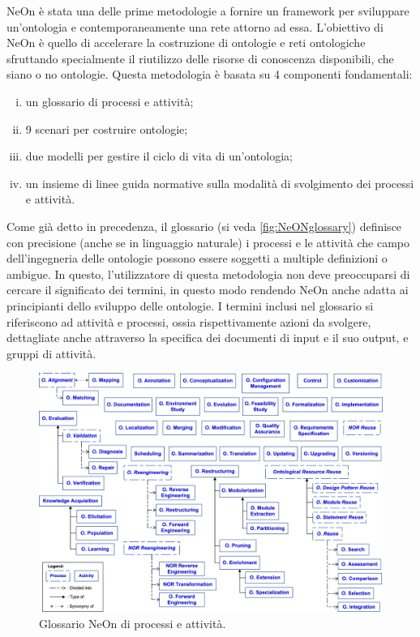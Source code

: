 NeOn \cite{NeOn} è stata una delle prime metodologie a fornire un framework per sviluppare un'ontologia e contemporaneamente una rete attorno ad essa. L'obiettivo di NeOn è quello di accelerare la costruzione di ontologie e reti ontologiche sfruttando specialmente il riutilizzo delle risorse di conoscenza disponibili, che siano o no ontologie. Questa metodologia è basata su 4 componenti fondamentali:
\begin{enumerate}[i.]
	\item un glossario di processi e attività;
	\label{itm:glossario}
	\item 9 scenari per costruire ontologie;
	\label{itm:scenari}
	\item due modelli per gestire il ciclo di vita di un'ontologia;
	\item un insieme di linee guida normative sulla modalità di svolgimento dei processi e attività.
\end{enumerate}
Come già detto in precedenza, il glossario (si veda \autoref{fig:NeONglossary}) definisce con precisione (anche se in linguaggio naturale) i processi e le attività che campo dell'ingegneria delle ontologie possono essere soggetti a multiple definizioni o ambigue. In questo, l'utilizzatore di questa metodologia non deve preoccuparsi di cercare il significato dei termini, in questo modo rendendo NeOn anche adatta ai principianti dello sviluppo delle ontologie. I termini inclusi nel glossario si riferiscono ad attività e processi, ossia rispettivamente azioni da svolgere, dettagliate anche attraverso la specifica dei documenti di input e il suo output, e gruppi di attività. 

\begin{figure}
	\centering
	\includegraphics[scale=0.8]{pictures/NeOn-Glossary.jpg}
	\caption{Glossario NeOn \cite{NeOn} di processi e attività.}
	\label{fig:NeONglossary}
\end{figure}

